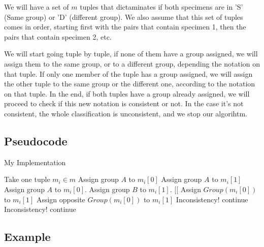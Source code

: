 \documentclass{article}
\begin{document}
We will have a set of $m$ tuples that dictaminates if both specimens are in 'S' (Same group) or 'D' (different group). We also assume that this set of tuples comes in order, starting first with the pairs that contain specimen 1, then the pairs that contain specimen 2, etc.

We will start going tuple by tuple, if none of them have a group assigned, we will assign them to the same group, or to a different group, depending the notation on that tuple. If only one member of the tuple has a group assigned, we will assign the other tuple to the same group or the different one, according to the notation on that tuple. In the end, if both tuples have a group already assigned, we will proceed to check if this new notation is consistent or not. In the case it's not consistent, the whole classification is unconsistent, and we stop our algorihtm.

\subsection*{Pseudocode}

\begin{algorithm}[H]
\caption{My Implementation}
\begin{algorithmic}[1]
 \State Take one tuple $m_i \in m$
   \State Assign group $A$ to $m_i[0]$
   \State Assign group $A$ to $m_i[1]$
   \State Assign group $A$ to $m_i[0]$.
   \State Assign group $B$ to $m_i[1]$.
  \EndIf
 \EndIf
 [[
   \State Assign $Group(m_i[0])$ to $m_i[1]$
   \State Assign opposite $Group(m_i[0])$ to $m_i[1]$
  \EndIf
 \EndIf
    \State Inconsistency!
   \Else
    \State continue
   \EndIf
    \State Inconsistency!
   \Else
    \State continue
   \EndIf
  \EndIf
 \EndIf
\EndWhile
\end{algorithmic}
\end{algorithm}

\subsection*{Example}
\end{document}
